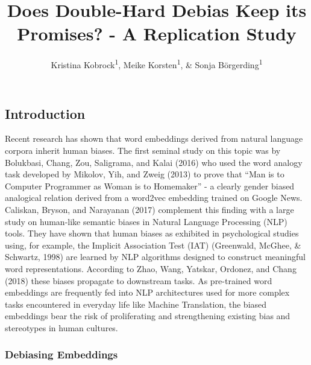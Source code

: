 \documentclass[
  english,
  man,floatsintext]{apa6}
\title{Does Double-Hard Debias Keep its Promises? - A Replication Study}
\author{Kristina Kobrock\textsuperscript{1}, Meike Korsten\textsuperscript{1}, \& Sonja Börgerding\textsuperscript{1}}
\date{}
\affiliation{\vspace{0.5cm}\textsuperscript{1} University of Osnabrück}
\begin{document}
\maketitle

\hypertarget{introduction}{%
\subsection{Introduction}\label{introduction}}

Recent research has shown that word embeddings derived from natural language corpora inherit human biases. The first seminal study on this topic was by Bolukbasi, Chang, Zou, Saligrama, and Kalai (2016) who used the word analogy task developed by Mikolov, Yih, and Zweig (2013) to prove that ``Man is to Computer Programmer as Woman is to Homemaker'' - a clearly gender biased analogical relation derived from a word2vec embedding trained on Google News. Caliskan, Bryson, and Narayanan (2017) complement this finding with a large study on human-like semantic biases in Natural Language Processing (NLP) tools. They have shown that human biases as exhibited in psychological studies using, for example, the Implicit Association Test (IAT) (Greenwald, McGhee, \& Schwartz, 1998) are learned by NLP algorithms designed to construct meaningful word representations. According to Zhao, Wang, Yatskar, Ordonez, and Chang (2018) these biases propagate to downstream tasks. As pre-trained word embeddings are frequently fed into NLP architectures used for more complex tasks encountered in everyday life like Machine Translation, the biased embeddings bear the risk of proliferating and strengthening existing bias and stereotypes in human cultures.

\hypertarget{debiasing-embeddings}{%
\subsubsection{Debiasing Embeddings}\label{debiasing-embeddings}}
\end{document}
